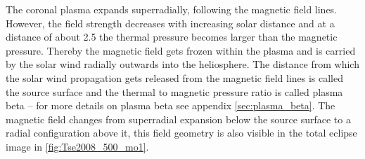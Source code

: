 The coronal plasma expands superradially, following the magnetic field lines. However, the field strength decreases with increasing solar distance and at a distance of about \SI{2.5}{\Rs} the thermal pressure becomes larger than the magnetic pressure. Thereby the magnetic field gets frozen within the plasma and is carried by the solar wind radially outwards into the heliosphere. The distance from which the solar wind propagation gets released from the magnetic field lines is called the source surface \citep{Schatten1969} and the thermal to magnetic pressure ratio is called plasma beta -- for more details on plasma beta see appendix \autoref{sec:plasma_beta}. The magnetic field changes from superradial expansion below the source surface to a radial configuration above it, this field geometry is also visible in the total eclipse image in \autoref{fig:Tse2008_500_mo1}.

